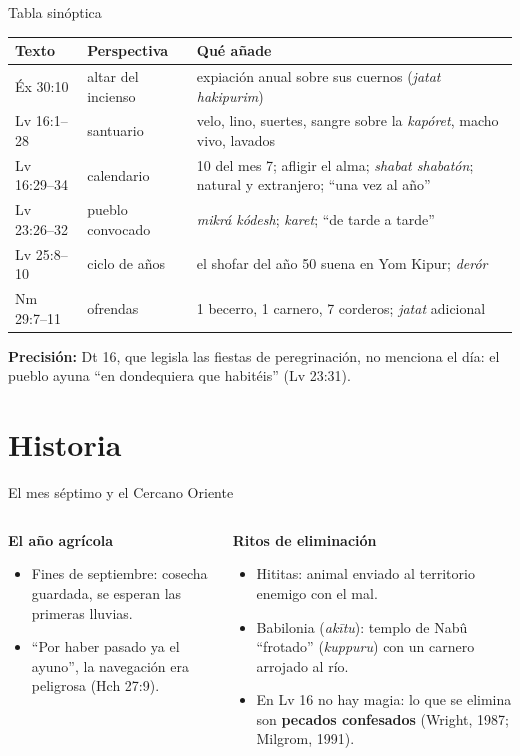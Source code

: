 \documentclass[hyperref={bookmarks=false},aspectratio=169]{beamer}
\newcommand{\destacar}[1]{\textbf{\textcolor{tierraroja}{#1}}}
\newcommand{\precision}[1]{{\footnotesize\color{sepia}\textbf{Precisión:} #1}}
\begin{document}
\begin{frame}{Tabla sinóptica}
\scriptsize\renewcommand{\arraystretch}{1.2}
\begin{tabular}{@{}L{1.7cm}L{3.0cm}L{6.8cm}@{}}
\toprule
\textbf{Texto} & \textbf{Perspectiva} & \textbf{Qué añade} \\ \midrule
Éx 30:10 & altar del incienso & expiación anual sobre sus cuernos (\emph{jatat hakipurim}) \\
Lv 16:1--28 & santuario & velo, lino, suertes, sangre sobre la \emph{kapóret}, macho vivo, lavados \\
Lv 16:29--34 & calendario & 10 del mes 7; afligir el alma; \emph{shabat shabatón}; natural y extranjero; ``una vez al año'' \\
Lv 23:26--32 & pueblo convocado & \emph{mikrá kódesh}; \emph{karet}; ``de tarde a tarde'' \\
Lv 25:8--10 & ciclo de años & el shofar del año 50 suena en Yom Kipur; \emph{derór} \\
Nm 29:7--11 & ofrendas & 1 becerro, 1 carnero, 7 corderos; \emph{jatat} adicional \\
\bottomrule
\end{tabular}\par\medskip
\precision{Dt 16, que legisla las fiestas de peregrinación, no menciona el día: el pueblo ayuna ``en dondequiera que habitéis'' (Lv 23:31).}
\end{frame}

\section{Historia}

\begin{frame}{El mes séptimo y el Cercano Oriente}
\begin{columns}[t,onlytextwidth]
\begin{column}{0.49\textwidth}\small
\destacar{El año agrícola}
\begin{itemize}
\item Fines de septiembre: cosecha guardada, se esperan las primeras lluvias.
\item ``Por haber pasado ya el ayuno'', la navegación era peligrosa (Hch 27:9).
\end{itemize}
\end{column}
\begin{column}{0.49\textwidth}\small
\destacar{Ritos de eliminación}
\begin{itemize}
\item Hititas: animal enviado al territorio enemigo con el mal.
\item Babilonia (\emph{akītu}): templo de Nabû ``frotado'' (\emph{kuppuru}) con un carnero arrojado al río.
\item En Lv 16 no hay magia: lo que se elimina son \destacar{pecados confesados} (Wright, 1987; Milgrom, 1991).
\end{itemize}
\end{column}
\end{columns}
\end{frame}
\end{document}
